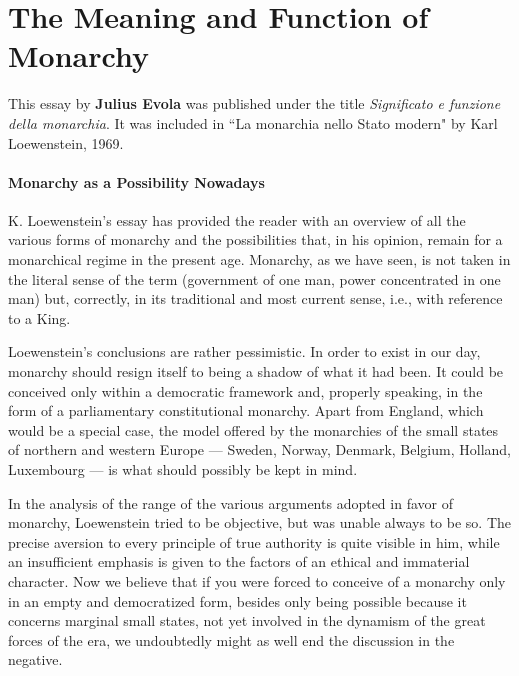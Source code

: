 \section{The Meaning and Function of Monarchy}

\label{sec:MeaningMonarchy}

\begin{quotex}
This essay by \textbf{Julius Evola} was published under the title \textit{Significato e funzione della monarchia}. It was included in ``La monarchia nello Stato modern" by Karl Loewenstein, 1969.
\end{quotex}

\paragraph{Monarchy as a Possibility Nowadays} K. Loewenstein's essay has provided the reader with an overview of all the various forms of monarchy and the possibilities that, in his opinion, remain for a monarchical regime in the present age. Monarchy, as we have seen, is not taken in the literal sense of the term (government of one man, power concentrated in one man) but, correctly, in its traditional and most current sense, i.e., with reference to a King.

Loewenstein's conclusions are rather pessimistic. In order to exist in our day, monarchy should resign itself to being a shadow of what it had been. It could be conceived only within a democratic framework and, properly speaking, in the form of a parliamentary constitutional monarchy. Apart from England, which would be a special case, the model offered by the monarchies of the small states of northern and western Europe — Sweden, Norway, Denmark, Belgium, Holland, Luxembourg — is what should possibly be kept in mind.

In the analysis of the range of the various arguments adopted in favor of monarchy, Loewenstein tried to be objective, but was unable always to be so. The precise aversion to every principle of true authority is quite visible in him, while an insufficient emphasis is given to the factors of an ethical and immaterial character. Now we believe that if you were forced to conceive of a monarchy only in an empty and democratized form, besides only being possible because it concerns marginal small states, not yet involved in the dynamism of the great forces of the era, we undoubtedly might as well end the discussion in the negative.

